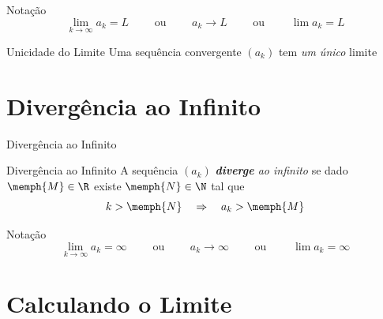 \documentclass[fleqn,utf8,aspectratio=169,12pt]{beamer}
\begin{document}
\begin{frame}{Notação}
  \[
    \lim_{k\to \infty} a_k = L \qquad\text{ ou }\qquad
    a_k \to L                  \qquad\text{ ou }\qquad
    \lim a_k = L
  \]
\end{frame}

\begin{frame}{Unicidade do Limite}
  Uma sequência convergente $(a_k)$ tem \emph{um único} limite
\end{frame}



\section{Divergência ao Infinito}

\begin{frame}{Divergência ao Infinito}
  \centering
  \scalebox{0.9}{}
\end{frame}

\begin{frame}{Divergência ao Infinito}
  A sequência $(a_k)$ \emph{\textbf{diverge} ao infinito} se dado
  $\memph{M}\in\R$ existe $\memph{N}\in\N$ tal que
  \[
    k > \memph{N} \quad \Rightarrow \quad a_k > \memph{M}
  \]
\end{frame}

\begin{frame}{Notação}
  \[
    \lim_{k\to\infty} a_k=\infty
    \qquad\text{ ou }\qquad
    a_k\to \infty
    \qquad\text{ ou }\qquad
    \lim a_k=\infty
  \]
\end{frame}

\section{Calculando o Limite}
\end{document}
